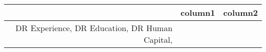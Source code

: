 \documentclass[12pt,landscape]{article}
\newcommand{\graph}[3]{
\raisebox{-#1mm}{\texttt{[image: \#3]}}
}
\begin{document}
\begin{table}[ht]
\centering
\begin{tabular}{rll}
  \hline
 & column1 & column2 \\ 
  \hline
DR Experience, %
  DR Education, %
  DR Human Capital, %
   \hline
\end{tabular}
\end{table}
\end{document}
